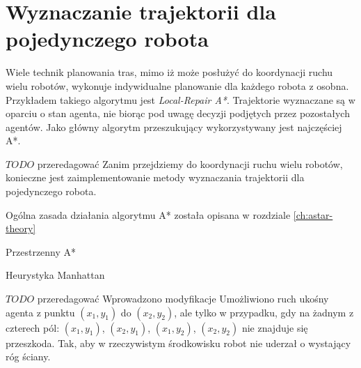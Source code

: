 \section{Wyznaczanie trajektorii dla pojedynczego robota}
\label{ch:alg-single-astar}

Wiele technik planowania tras, mimo iż może posłużyć do koordynacji ruchu wielu robotów, wykonuje indywidualne planowanie dla każdego robota z osobna. Przykładem takiego algorytmu jest {\it Local-Repair A*}. Trajektorie wyznaczane są w oparciu o stan agenta, nie biorąc pod uwagę decyzji podjętych przez pozostałych agentów. Jako główny algorytm przeszukujący wykorzystywany jest najczęściej A*.

$TODO$ przeredagować
Zanim przejdziemy do koordynacji ruchu wielu robotów, konieczne jest zaimplementowanie metody wyznaczania trajektorii dla pojedynczego robota.

Ogólna zasada działania algorytmu A* została opisana w rozdziale \ref{ch:astar-theory}

Przestrzenny A*

Heurystyka Manhattan

$TODO$ przeredagować
Wprowadzono modyfikacje
Umożliwiono ruch ukośny agenta z punktu $(x_1, y_1)$ do $(x_2, y_2)$, ale tylko w przypadku, gdy na żadnym z czterech pól: $(x_1, y_1)$, $(x_2, y_1)$, $(x_1, y_2)$, $(x_2, y_2)$ nie znajduje się przeszkoda. Tak, aby w rzeczywistym środkowisku robot nie uderzał o wystający róg ściany.

